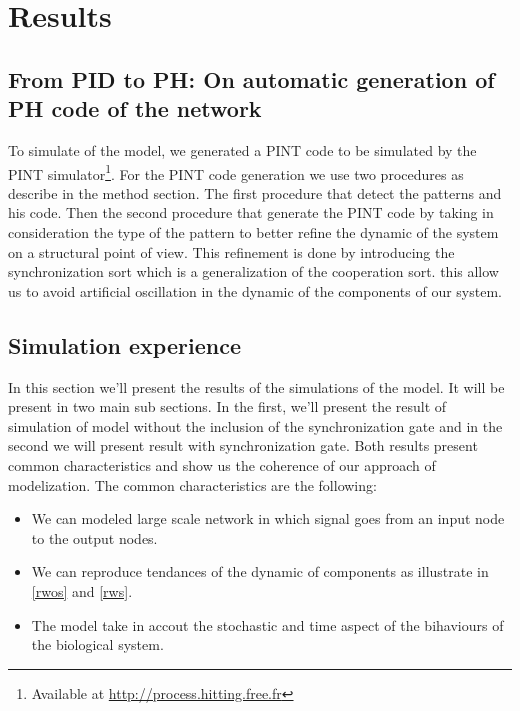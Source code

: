 
\section{Results}

\subsection{From PID to PH: On automatic generation of PH code of the network}

To simulate of the model, we generated a PINT code to be simulated by the PINT simulator\footnote{Available at \url{http://process.hitting.free.fr}}. 
For the PINT code generation we use two procedures as describe in the method section. The first procedure that detect the patterns and his code. Then the second 
procedure that generate the PINT code by taking in consideration the type of the pattern to better refine the dynamic of the system on a structural point of view.
This refinement is done by introducing the synchronization sort  which is a generalization of the cooperation sort. this allow us to avoid artificial oscillation
in the dynamic of the components of our system.


\subsection{Simulation experience}
In this section we'll present the results of the simulations of the model. It will be present in two 
main sub sections. In the first, we'll present the result of simulation of model without the inclusion 
of the synchronization gate and in the second we will present result with synchronization gate. Both results
present common characteristics and show us the coherence of our approach of modelization. The common characteristics
are the following:
\begin{itemize}
 \item We can modeled large scale network in which signal goes from an input node to the output nodes.
 \item We can reproduce tendances of the dynamic of components as illustrate in \ref{rwos} and \ref{rws}.
 \item The model take in accout the stochastic and time aspect of the bihaviours of the biological system.
\end{itemize}


